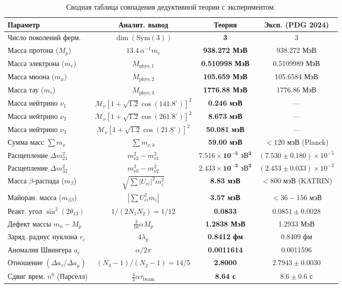 \documentclass[12pt,a4paper]{article}
\begin{document}
	\begin{table}[h!]
		\centering
		\small
		\begin{tabular}{lccc}
			\toprule
			\textbf{Параметр} & \textbf{Аналит. вывод} & \textbf{Теория} & \textbf{Эксп. (PDG 2024)} \\
			\midrule
			Число поколений ферм. & $\dim(\mathrm{Sym}(3))$ & \textbf{3} & 3 \\
			Масса протона ($M_p$) & $13.4 \, \alpha^{-1} m_e$ & \textbf{938.272 МэВ} & 938.272 МэВ \\
			Масса электрона ($m_e$) & $M_{\text{phys}, 1}$ & \textbf{0.510998 МэВ} & 0.5109989 МэВ \\
			Масса мюона ($m_\mu$) & $M_{\text{phys}, 2}$ & \textbf{105.659 МэВ} & 105.6584 МэВ \\
			Масса тау ($m_\tau$) & $M_{\text{phys}, 3}$ & \textbf{1776.88 МэВ} & 1776.86 МэВ \\
			Масса нейтрино $\nu_1$ & $\mathcal{M}_\nu [1 + \sqrt{1.2}\cos(141.8^\circ)]^2$ & \textbf{0.246 мэВ} & --- \\
			Масса нейтрино $\nu_2$ & $\mathcal{M}_\nu [1 + \sqrt{1.2}\cos(261.8^\circ)]^2$ & \textbf{8.673 мэВ} & --- \\
			Масса нейтрино $\nu_3$ & $\mathcal{M}_\nu [1 + \sqrt{1.2}\cos(21.8^\circ)]^2$ & \textbf{50.081 мэВ} & --- \\
			Сумма масс $\sum m_\nu$ & $\sum m_{\nu, k}$ & \textbf{59.00 мэВ} & $< 120$ мэВ (Planck) \\
			Расщепление $\Delta m_{21}^2$ & $m_{\nu 2}^2 - m_{\nu 1}^2$ & $\mathbf{7.516 \times 10^{-5} \text{ эВ}^2}$ & $(7.530 \pm 0.180) \times 10^{-5}$ \\
			Расщепление $\Delta m_{32}^2$ & $m_{\nu 3}^2 - m_{\nu 2}^2$ & $\mathbf{2.433 \times 10^{-3} \text{ эВ}^2}$ & $(2.453 \pm 0.033) \times 10^{-3}$ \\
			Масса $\beta$-распада ($m_\beta$) & $\sqrt{\sum |U_{ei}|^2 m_i^2}$ & \textbf{8.83 мэВ} & $< 800$ мэВ (KATRIN) \\
			Майоран. масса ($m_{\beta\beta}$) & $|\sum U_{ei}^2 m_i|$ & \textbf{3.57 мэВ} & $< 36 - 156$ мэВ \\
			Реакт. угол $\sin^2(2\theta_{13})$ & $1/(2 N_1 N_2) = 1/12$ & \textbf{0.0833} & $0.0851 \pm 0.0028$ \\
			Дефект массы $m_n - M_p$ & $\frac{3}{16}\alpha M_p$ & \textbf{1.2838 МэВ} & 1.2933 МэВ \\
			Заряд. радиус нуклона $r_c$ & $4 \lambda_p$ & \textbf{0.8412 фм} & 0.8409 фм \\
			Аномалия Швингера $a_e$ & $\alpha / 2\pi$ & \textbf{0.0011614} & 0.0011596 \\
			Отношение $(\Delta a_\tau / \Delta a_\mu)$ & $(N_3-1)/(N_2-1) = 14/5$ & \textbf{2.8000} & $2.7943 \pm 0.0030$ \\
			Сдвиг врем. $n^0$ (Парселл) & $\frac{4}{3}\alpha\tau_{\text{beam}}$ & \textbf{8.64 с} & $8.6 \pm 0.6$ с \\
			\bottomrule
		\end{tabular}
		\caption{Сводная таблица совпадения дедуктивной теории с экспериментом.}
	\end{table}
	
\end{document}
